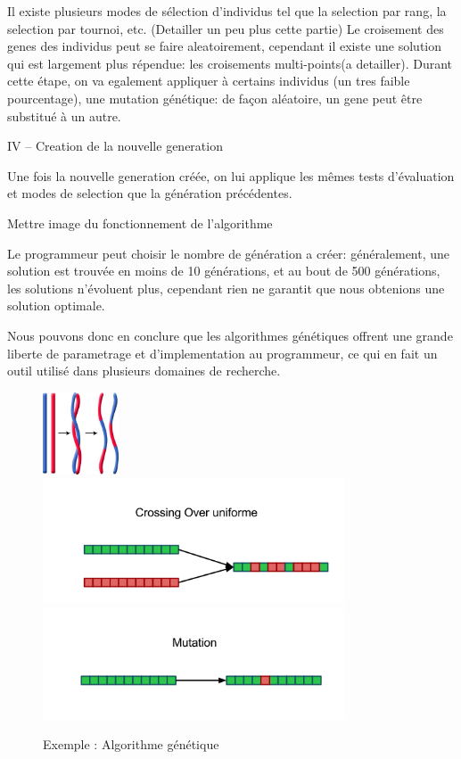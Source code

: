 	Il existe plusieurs modes de sélection d'individus tel que la selection par rang, la selection par tournoi, etc. (Detailler un peu plus cette partie)
	Le croisement des genes des individus peut se faire aleatoirement, cependant il existe une solution qui est largement plus répendue: les croisements multi-points(a detailler).
	Durant cette étape, on va egalement appliquer à certains individus (un tres faible pourcentage), une mutation génétique: de façon aléatoire, un gene peut être substitué à un autre.

IV – Creation de la nouvelle generation

	Une fois la nouvelle generation créée, on lui applique les mêmes tests d'évaluation et modes de selection que la génération précédentes.

Mettre image du fonctionnement de l'algorithme

Le programmeur peut choisir le nombre de génération a créer: généralement, une solution est trouvée en moins de 10 générations, et au bout de 500 générations, les solutions n'évoluent plus, cependant rien ne garantit que nous obtenions une solution optimale.

Nous pouvons donc en conclure que les algorithmes génétiques offrent une grande liberte de parametrage et d'implementation au programmeur, ce qui en fait un outil utilisé dans plusieurs domaines de recherche.


\begin{figure}[H]
    \centering
    \includegraphics[width=0.2\textwidth]{./pictures/adn.jpg}
    \includegraphics[width=0.8\textwidth]{./pictures/reproduction.png}
    \includegraphics[width=0.8\textwidth]{./pictures/mutation.png}
    
    \caption{Exemple : Algorithme génétique}
    \label{fig:awesome_image}
\end{figure}

\clearpage
